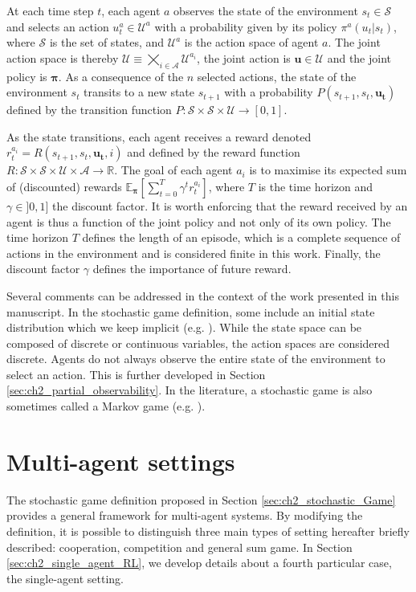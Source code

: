 At each time step $t$, each agent $a$ observes the state of the environment $s_t \in \mathcal{S}$ and selects an action $u_t^a \in \mathcal{U}^a$ with a probability given by its policy $\pi^a(u_t|s_t)$, where $\mathcal{S}$ is the set of states, and $\mathcal{U}^a$ is the action space of agent $a$.
The joint action space is thereby $\mathcal{U} \equiv \bigtimes_{i \in \mathcal{A}} \mathcal{U}^{a_i}$, the joint action is $\mathbf{u} \in \mathcal{U}$ and the joint policy is $\mathbf{\pi}$.
As a consequence of the $n$ selected actions, the state of the environment $s_t$ transits to a new state $s_{t+1}$ with a probability $P(s_{t+1}, s_t, \mathbf{u_t})$ defined by the transition function $P:\mathcal{S} \times \mathcal{S} \times \mathcal{U} \rightarrow [0,1]$.

As the state transitions, each agent receives a reward denoted $r_t^{a_i} = R(s_{t+1}, s_t, \mathbf{u_t}, i)$ and defined by the reward function $R: \mathcal{S} \times \mathcal{S} \times \mathcal{U} \times \mathcal{A} \rightarrow \mathbb{R}$.
The goal of each agent $a_i$ is to maximise its expected sum of (discounted) rewards $\mathbb{E}_{\mathbf{\pi}}\left[ \sum_{t=0}^{T} \gamma^t r^{a_i}_t \right]$, where $T$ is the time horizon and $\gamma \in ]0, 1]$ the discount factor.
It is worth enforcing that the reward received by an agent is thus a function of the joint policy and not only of its own policy.
The time horizon $T$ defines the length of an episode, which is a complete sequence of actions in the environment and is considered finite in this work.
Finally, the discount factor $\gamma$ defines the importance of future reward.


Several comments can be addressed in the context of the work presented in this manuscript.
In the stochastic game definition, some include an initial state distribution which we keep implicit (e.g. \citep{marl-book}).
While the state space can be composed of discrete or continuous variables, the action spaces are considered discrete.
Agents do not always observe the entire state of the environment to select an action.
This is further developed in Section \ref{sec:ch2_partial_observability}.
In the literature, a stochastic game is also sometimes called a Markov game (e.g. \citep{MarkovGames}).

\section{Multi-agent settings} 
\label{sec:ch2_multi_agent_settings}
The stochastic game definition proposed in Section \ref{sec:ch2_stochastic_Game} provides a general framework for multi-agent systems.
By modifying the definition, it is possible to distinguish three main types of setting hereafter briefly described: cooperation, competition and general sum game.
In Section \ref{sec:ch2_single_agent_RL}, we develop details about a fourth particular case, the single-agent setting.

